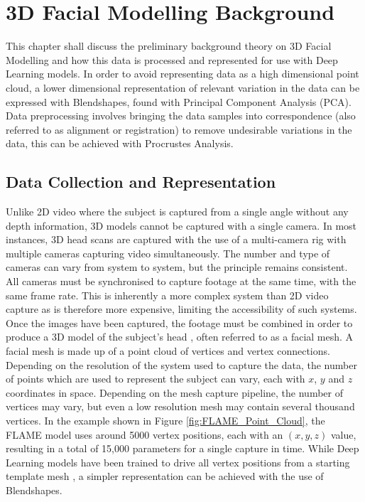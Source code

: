 %
%
%
%
%

\chapter{3D Facial Modelling Background}

This chapter shall discuss the preliminary background theory on 3D Facial Modelling and how this data is processed and represented for use with Deep Learning models.
In order to avoid representing data as a high dimensional point cloud, a lower dimensional representation of relevant variation in the data can be expressed with Blendshapes, found with Principal Component Analysis (PCA).
Data preprocessing involves bringing the data samples into correspondence (also referred to as alignment or registration) to remove undesirable variations in the data, this can be achieved with Procrustes Analysis.

\section{Data Collection and Representation}
Unlike 2D video where the subject is captured from a single angle without any depth information, 3D models cannot be captured with a single camera.
In most instances, 3D head scans are captured with the use of a multi-camera rig with multiple cameras capturing video simultaneously.
The number and type of cameras can vary from system to system, but the principle remains consistent.
All cameras must be synchronised to capture footage at the same time, with the same frame rate.
This is inherently a more complex system than 2D video capture as is therefore more expensive, limiting the accessibility of such systems.  
Once the images have been captured, the footage must be combined in order to produce a 3D model of the subject's head \cite{Li2017}, often referred to as a facial mesh.
A facial mesh is made up of a point cloud of vertices and vertex connections.
Depending on the resolution of the system used to capture the data, the number of points which are used to represent the subject can vary, each with $x$, $y$ and $z$ coordinates in space.
Depending on the mesh capture pipeline, the number of vertices may vary, but even a low resolution mesh may contain several thousand vertices.
In the example shown in Figure \ref{fig:FLAME_Point_Cloud}, the FLAME model \cite{Li2017} uses around 5000 vertex positions, each with an $(x, y, z)$ value, resulting in a total of 15,000 parameters for a single capture in time.
While Deep Learning models have been trained to drive all vertex positions from a starting template mesh \cite{Karras2017a}, a simpler representation can be achieved with the use of Blendshapes.

